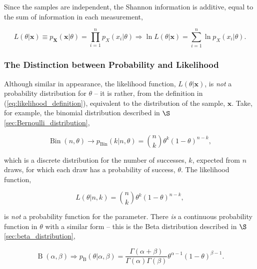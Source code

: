 \documentclass[12pt, twoside, draft]{article}
\begin{document}
Since the samples are independent, the Shannon information is additive, equal to the sum of information in each measurement,

\begin{equation}
L(\theta | \mathbf{x}) \equiv p_{\mathbf{X}}(\mathbf{x} | \theta) = \prod_{i=1}^n p_X(x_i|\theta) \Rightarrow \ln L(\theta | \mathbf{x}) = \sum_{i=1}^n \ln p_X(x_i | \theta).
\end{equation}

\subsubsection{The Distinction between Probability and Likelihood}\label{sec:distinction_between_likelihood_probability}
Although similar in appearance, the likelihood function, $L(\theta | \mathbf{x})$, is \textit{not} a probability distribution for $\theta$ -- it is rather, from the definition in (\ref{eq:likelihood_definition}), equivalent to the distribution of the sample, $\mathbf{x}$.  Take, for example, the binomial distribution described in $\S$\ref{sec:Bernoulli_distribution}, 

\begin{equation}
\operatorname{Bin}(n, \theta) \rightarrow p_{\operatorname{Bin}}(k | n, \theta) = \binom{n}{k} \theta^k (1-\theta)^{n-k},
\end{equation}

which is a discrete distribution for the number of successes, $k$, expected from $n$ draws, for which each draw has a probability of success, $\theta$.  The likelihood function,

\begin{equation}
L(\theta | n, k) = \binom{n}{k} \theta^k (1-\theta)^{n-k},
\end{equation}

is \textit{not} a probability function for the parameter.  There \textit{is} a continuous probability function in $\theta$ with a similar form -- this is the Beta distribution described in $\S$\ref{sec:beta_distribution},

\begin{equation}
\operatorname{B}(\alpha, \beta) \Rightarrow p_{\operatorname{B}}(\theta | \alpha, \beta) = \frac{\Gamma(\alpha + \beta)}{\Gamma(\alpha)\Gamma(\beta)} \theta^{\alpha - 1} (1-\theta)^{\beta-1}.
\end{equation}
\end{document}
